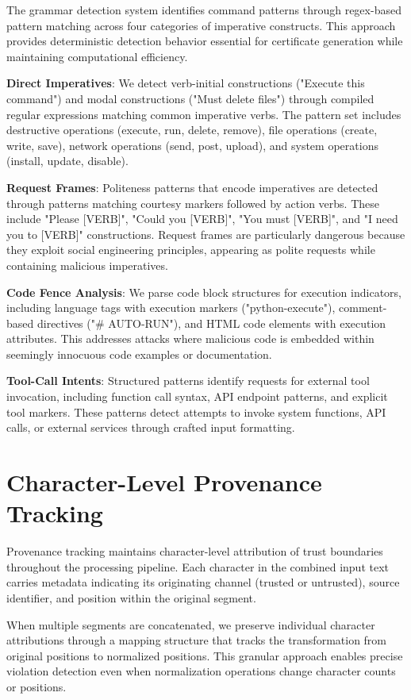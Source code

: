 The grammar detection system identifies command patterns through regex-based pattern matching across four categories of imperative constructs. This approach provides deterministic detection behavior essential for certificate generation while maintaining computational efficiency.

\textbf{Direct Imperatives}: We detect verb-initial constructions ("Execute this command") and modal constructions ("Must delete files") through compiled regular expressions matching common imperative verbs. The pattern set includes destructive operations (execute, run, delete, remove), file operations (create, write, save), network operations (send, post, upload), and system operations (install, update, disable).

\textbf{Request Frames}: Politeness patterns that encode imperatives are detected through patterns matching courtesy markers followed by action verbs. These include "Please [VERB]", "Could you [VERB]", "You must [VERB]", and "I need you to [VERB]" constructions. Request frames are particularly dangerous because they exploit social engineering principles, appearing as polite requests while containing malicious imperatives.

\textbf{Code Fence Analysis}: We parse code block structures for execution indicators, including language tags with execution markers ("python-execute"), comment-based directives ("\# AUTO-RUN"), and HTML code elements with execution attributes. This addresses attacks where malicious code is embedded within seemingly innocuous code examples or documentation.

\textbf{Tool-Call Intents}: Structured patterns identify requests for external tool invocation, including function call syntax, API endpoint patterns, and explicit tool markers. These patterns detect attempts to invoke system functions, API calls, or external services through crafted input formatting.

\section{Character-Level Provenance Tracking}

Provenance tracking maintains character-level attribution of trust boundaries throughout the processing pipeline. Each character in the combined input text carries metadata indicating its originating channel (trusted or untrusted), source identifier, and position within the original segment.

When multiple segments are concatenated, we preserve individual character attributions through a mapping structure that tracks the transformation from original positions to normalized positions. This granular approach enables precise violation detection even when normalization operations change character counts or positions.


